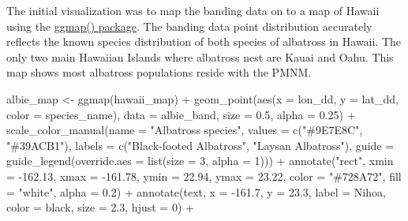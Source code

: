 \documentclass[
]{article}
\newenvironment{Shaded}{\begin{snugshade}}{\end{snugshade}}
\newcommand{\AttributeTok}[1]{\textcolor[rgb]{0.77,0.63,0.00}{#1}}
\newcommand{\DecValTok}[1]{\textcolor[rgb]{0.00,0.00,0.81}{#1}}
\newcommand{\FloatTok}[1]{\textcolor[rgb]{0.00,0.00,0.81}{#1}}
\newcommand{\FunctionTok}[1]{\textcolor[rgb]{0.00,0.00,0.00}{#1}}
\newcommand{\NormalTok}[1]{#1}
\newcommand{\OtherTok}[1]{\textcolor[rgb]{0.56,0.35,0.01}{#1}}
\newcommand{\SpecialCharTok}[1]{\textcolor[rgb]{0.00,0.00,0.00}{#1}}
\newcommand{\StringTok}[1]{\textcolor[rgb]{0.31,0.60,0.02}{#1}}
\begin{document}
The initial visualization was to map the banding data on to a map of
Hawaii using the
\href{https://cran.r-project.org/web/packages/ggmap/readme/README.html}{ggmap()
package}. The banding data point distribution accurately reflects the
known species distribution of both species of albatross in Hawaii. The
only two main Hawaiian Islands where albatross nest are Kauai and Oahu.
This map shows most albatross populations reside with the PMNM.

\begin{Shaded}
\begin{Highlighting}[]
\NormalTok{albie\_map }\OtherTok{\textless{}{-}} \FunctionTok{ggmap}\NormalTok{(hawaii\_map) }\SpecialCharTok{+}
  \FunctionTok{geom\_point}\NormalTok{(}\FunctionTok{aes}\NormalTok{(}\AttributeTok{x =}\NormalTok{ lon\_dd, }\AttributeTok{y =}\NormalTok{ lat\_dd, }\AttributeTok{color =}\NormalTok{ species\_name),}
             \AttributeTok{data =}\NormalTok{ albie\_band,}
             \AttributeTok{size =} \FloatTok{0.5}\NormalTok{,}
             \AttributeTok{alpha =} \FloatTok{0.25}\NormalTok{) }\SpecialCharTok{+}
  \FunctionTok{scale\_color\_manual}\NormalTok{(}\AttributeTok{name =} \StringTok{"Albatross species"}\NormalTok{,}
                     \AttributeTok{values =} \FunctionTok{c}\NormalTok{(}\StringTok{"\#9E7E8C"}\NormalTok{, }\StringTok{"\#39ACB1"}\NormalTok{),}
                     \AttributeTok{labels =} \FunctionTok{c}\NormalTok{(}\StringTok{"Black{-}footed Albatross"}\NormalTok{, }\StringTok{"Laysan Albatross"}\NormalTok{),}
                     \AttributeTok{guide =} \FunctionTok{guide\_legend}\NormalTok{(}\AttributeTok{override.aes =} \FunctionTok{list}\NormalTok{(}\AttributeTok{size =} \DecValTok{3}\NormalTok{, }\AttributeTok{alpha =} \DecValTok{1}\NormalTok{))) }\SpecialCharTok{+}
  \FunctionTok{annotate}\NormalTok{(}\StringTok{"rect"}\NormalTok{, }\AttributeTok{xmin =} \SpecialCharTok{{-}}\FloatTok{162.13}\NormalTok{, }\AttributeTok{xmax =} \SpecialCharTok{{-}}\FloatTok{161.78}\NormalTok{, }\AttributeTok{ymin =} \FloatTok{22.94}\NormalTok{, }\AttributeTok{ymax =} \FloatTok{23.22}\NormalTok{, }
           \AttributeTok{color =} \StringTok{"\#728A72"}\NormalTok{, }\AttributeTok{fill =} \StringTok{"white"}\NormalTok{, }\AttributeTok{alpha =} \FloatTok{0.2}\NormalTok{) }\SpecialCharTok{+}
  \FunctionTok{annotate}\NormalTok{(}\StringTok{\textquotesingle{}text\textquotesingle{}}\NormalTok{, }\AttributeTok{x =} \SpecialCharTok{{-}}\FloatTok{161.7}\NormalTok{, }\AttributeTok{y =} \FloatTok{23.3}\NormalTok{, }
           \AttributeTok{label =} \StringTok{\textquotesingle{}Nihoa\textquotesingle{}}\NormalTok{, }\AttributeTok{color =} \StringTok{\textquotesingle{}black\textquotesingle{}}\NormalTok{, }\AttributeTok{size =} \FloatTok{2.3}\NormalTok{, }\AttributeTok{hjust =} \DecValTok{0}\NormalTok{) }\SpecialCharTok{+}

\end{Highlighting}
\end{Shaded}
\end{document}
